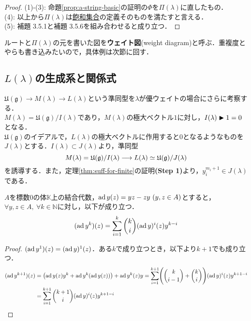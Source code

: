 \documentclass[rep_main]{subfiles}
\begin{document}
\begin{proof}
	(1)-(3): 命題\ref{prop:a-string-basic}の証明の$\Phi$を$\Pi(\lambda)$に直したもの．\\
	(4): 以上から$\Pi(\lambda)$は\hyperref[weight-saturated]{飽和集合}の定義そのものを満たすと言える．\\
	(5): 補題 3.5.1と補題 3.5.6を組み合わせると成り立つ．
\end{proof}
ルートと$\Pi(\lambda)$の元を書いた図を\textbf{ウェイト図}(weight diagram)と呼ぶ．重複度とやらも書き込みたいので，具体例は次節に回す．

\subsection{$L(\lambda)$の生成系と関係式}
$\mathfrak{U}(\mathfrak{g}) \to M(\lambda) \to L(\lambda)$という準同型を$\lambda$が優ウェイトの場合にさらに考察する．\\
$M(\lambda) = \mathfrak{U}(\mathfrak{g}) / I(\lambda)$であり，$M(\lambda)$の極大ベクトル$1$に対し，$I(\lambda) \blacktriangleright 1 = 0$となる．\\
$\mathfrak{U}(\mathfrak{g})$のイデアルで，$L(\lambda)$の極大ベクトルに作用すると$0$となるようなものを$J(\lambda)$とする．$I(\lambda) \subset J(\lambda)$より，準同型
\begin{equation}
	M(\lambda) = \mathfrak{U}(\mathfrak{g}) / I(\lambda) \longrightarrow L(\lambda) \simeq \mathfrak{U}(\mathfrak{g}) / J(\lambda)
\end{equation}
を誘導する．また，定理\ref{thm:suff-for-finite}の証明\textbf{(Step 1)}より，$y_i^{m_i + 1} \in J(\lambda)$である．
\begin{mylem}[label=lem:Lie-bracket-power]{}
	$A$を標数$0$の体$\mathbb{K}$上の結合代数，$\operatorname{ad} y(z) = yz - zy\ (y, z \in A)$とすると，\\
	$\forall y, z \in A,\ \forall k \in \mathbb{N}$に対し，以下が成り立つ．
	\begin{equation}
		(\operatorname{ad} y^k)(z) = \sum_{i=1}^k \binom{k}{i}(\operatorname{ad} y)^i(z)y^{k-i}
	\end{equation}
\end{mylem}
\begin{proof}
	$(\operatorname{ad} y^1)(z) = (\operatorname{ad} y)^1(z)$．ある$k$で成り立つとき，以下より$k+1$でも成り立つ．
	\begin{align}
		(\operatorname{ad} y^{k+1})(z) &= \bigl(\operatorname{ad} y(z)y^k + \operatorname{ad} y^k(\operatorname{ad} y(z))\bigr) + \operatorname{ad} y^k(z)y = \sum_{i=1}^{k+1} \Biggl(\binom{k}{i-1} + \binom{k}{i}\Biggr)(\operatorname{ad} y)^i(z)y^{k+1-i} \\
		&= \sum_{i=1}^{k+1} \binom{k+1}{i}(\operatorname{ad} y)^i(z)y^{k+1-i}
	\end{align}
	
\end{proof}
\end{document}
